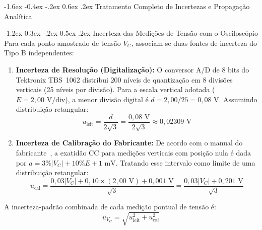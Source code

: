\documentclass[12pt, a4paper]{article}
\makeatletter
\renewcommand\section{\@startsection {section}{1}{\z@}%
                                   {-1.6ex \@plus -0.4ex \@minus -.2ex}%
                                   {0.6ex \@plus .2ex}%
                                   {\normalfont\large\bfseries}}
\renewcommand\subsection{\@startsection{subsection}{2}{\z@}%
                                     {-1.2ex\@plus -0.3ex \@minus -.2ex}%
                                     {0.5ex \@plus .2ex}%
                                     {\normalfont\normalsize\bfseries}}
\makeatother
\begin{document}
\clearpage
\section{Tratamento Completo de Incertezas e Propagação Analítica}\label{ap:incertezas}

\subsection{Incerteza das Medições de Tensão com o Osciloscópio}
Para cada ponto amostrado de tensão $V_C$, associam-se duas fontes de incerteza do Tipo B independentes:
\begin{enumerate}
    \item \textbf{Incerteza de Resolução (Digitalização):} O conversor A/D de 8 bits do Tektronix TBS~1062 distribui 200 níveis de quantização em 8 divisões verticais (25 níveis por divisão). Para a escala vertical adotada ($E = 2{,}00\text{ V/div}$), a menor divisão digital é $d = 2{,}00 / 25 = 0{,}08\text{ V}$. Assumindo distribuição retangular:
    \begin{equation}
        u_{\text{leit}} = \frac{d}{2\sqrt{3}} = \frac{0{,}08\text{ V}}{2\sqrt{3}} \approx 0{,}02309\text{ V}
    \end{equation}
    \item \textbf{Incerteza de Calibração do Fabricante:} De acordo com o manual do fabricante~\cite{tektronix}, a exatidão CC para medições verticais com posição nula é dada por $a = 3\% |V_C| + 10\% E + 1\text{ mV}$. Tratando esse intervalo como limite de uma distribuição retangular:
    \begin{equation}
        u_{\text{cal}} = \frac{0{,}03 |V_C| + 0{,}10 \times (2{,}00\text{ V}) + 0{,}001\text{ V}}{\sqrt{3}} = \frac{0{,}03 |V_C| + 0{,}201\text{ V}}{\sqrt{3}}
    \end{equation}
\end{enumerate}
A incerteza-padrão combinada de cada medição pontual de tensão é:
\begin{equation}
    u_{V_C} = \sqrt{u_{\text{leit}}^2 + u_{\text{cal}}^2}
\end{equation}
\end{document}
